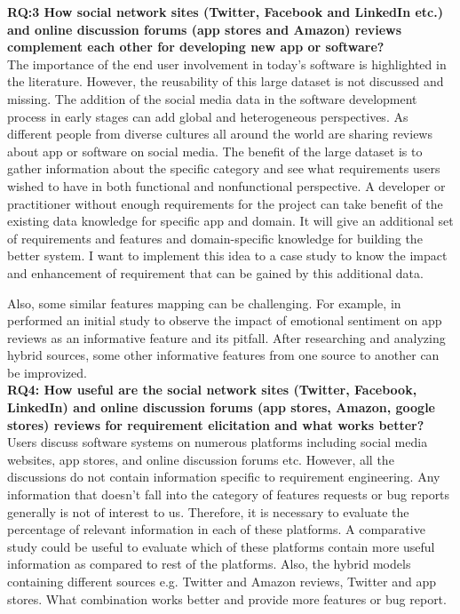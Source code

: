 \textbf{RQ:3 How social network sites (Twitter, Facebook and LinkedIn etc.) and online discussion
forums (app stores and Amazon) reviews complement each other for developing new
app or software?}\\
The importance of the end user involvement in today’s software is highlighted
in the literature. However, the reusability of this large dataset is not discussed and missing. The
addition of the social media data in the software development process in early stages can add
global and heterogeneous perspectives. As different people from diverse cultures all around the world are sharing reviews about app or software on social media. The benefit of the large dataset is to gather information
about the specific category and see what requirements users wished to have in both functional and
nonfunctional perspective. A developer or practitioner without enough requirements for the project
 can take benefit of the existing data knowledge for
 specific app and domain. It will give an additional set of requirements and features and
domain-specific knowledge for building the better system. I want to implement this idea to a case
study to know the impact and enhancement of requirement that can be gained by this additional
data.

	Also, some similar features mapping can be challenging. For example, in \cite{Martens:2017} performed an initial study to observe the impact of emotional sentiment on app reviews as an informative feature and its pitfall. After researching and analyzing hybrid sources, some other informative features from one source to another can be improvized.\\

\textbf{RQ4: How useful are the social network sites (Twitter, Facebook, LinkedIn) and online
discussion forums (app stores, Amazon, google stores) reviews for requirement elicitation
and what works better?}\\
Users discuss software systems on numerous platforms including social media websites,
app stores, and online discussion forums etc. However, all the discussions do not contain
information specific to requirement engineering. Any information that doesn’t fall into the
category of features requests or bug reports generally is not of interest to us. Therefore, it is
necessary to evaluate the percentage of relevant information in each of these platforms. A
comparative study could be useful to evaluate which of these platforms contain more useful
information as compared to rest of the platforms. Also, the hybrid models containing different
sources e.g. Twitter and Amazon reviews, Twitter and app stores. What combination works better
and provide more features or bug report.\\

